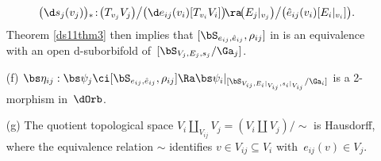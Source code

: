 \documentclass{article}
\begin{document}
\begin{dfn}
\begin{itemize}
\begin{equation*}
{}\!\!\bigl(\d s_j(v_j)\bigr){}_*\!:\!\bigl(T_{v_j}V_j\bigr)\big/
\bigl(\d e_{ij}(v_i)[T_{v_i}V_i]\bigr)\!\ra\!\bigl(E_j\vert_{ v_j}
\bigr)\big/\bigl(\hat e_{ij}(v_i)[E_i\vert_{v_i}]\bigr).\!\!{}
\end{equation*}
Theorem \ref{ds11thm3} then implies that $[\bS_{\smash{e_{ij},
\hat e_{ij}}},\rho_{ij}]$ in  is an equivalence with
an open d-suborbifold of~$[\bS_{V_j,E_j,s_j}/\Ga_j]$.
\item[(f)] $\bs\eta_{ij}:\bs\psi_j\ci[\bS_{e_{ij},\hat e_{ij}},
\rho_{ij}]\Ra\bs\psi_i\vert_{[\bS_{V_{ij},E_i \vert_{V_{ij}},
s_i\vert_{V_{ij}}}/\Ga_i]}$ is a 2-morphism in~$\dOrb$.
\item[(g)] The quotient topological space $V_i\amalg_{V_{ij}}V_j=
(V_i\amalg V_j)/\sim$ is Hausdorff, where the equivalence
relation $\sim$ identifies $v\in V_{ij}\subseteq V_i$
with~$e_{ij}(v)\in V_j$.
\end{itemize}
\label{ds11def6}
\end{dfn}
\end{document}

